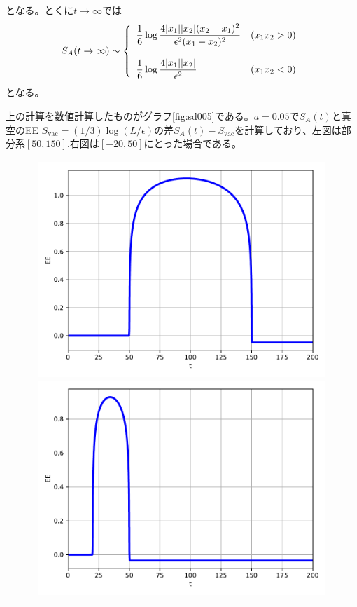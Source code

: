 となる。とくに$t\to \infty$では
\begin{align}
S_A(t\to\infty) \sim \left\{ \begin{array}{ll}
\bigskip\dfrac{1}{6}\log \dfrac{4|x_1||x_2|(x_2-x_1)^2}{\epsilon^2(x_1+x_2)^2}  &(x_1x_2>0)\\
\dfrac{1}{6}\log\dfrac{4|x_1||x_2|}{\epsilon^2} &(x_1x_2<0)
\end{array}\right.
\end{align}
となる。

上の計算を数値計算したものがグラフ\ref{fig:sd005}である。$a=0.05$で$S_A(t)$と真空のEE $S_\text{vac}=(1/3)\log(L/\epsilon)$の差$S_A(t)-S_\text{vac}$を計算しており、左図は部分系$[50,150]$,右図は$[-20,50]$にとった場合である。
\begin{figure}[h]
	\centering
	\begin{tabular}{c}
		\begin{minipage}{0.50\hsize}
			\centering
			\includegraphics[width=\linewidth]{sd005_50_150.pdf}
		\end{minipage}
		\begin{minipage}{0.50\hsize}
			\centering
			\includegraphics[width=\linewidth]{sd005_20_50.pdf}

\end{minipage}
\end{tabular}
\end{figure}
